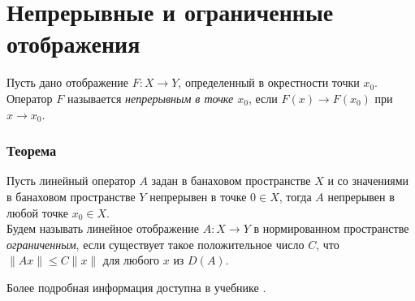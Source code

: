 \section{Непрерывные и ограниченные отображения}
\label{sec:q-9}
Пусть дано отображение $F : X \rightarrow Y$, определенный в окрестности точки $x_0$. Оператор $F$ называется \textit{непрерывным в точке $x_0$}, если $F(x)\rightarrow F(x_0)$ при $x \rightarrow x_0$.

\subsubsection*{Теорема}
Пусть линейный оператор $A$ задан в банаховом пространстве $X$ и со значениями в банаховом пространстве $Y$ непрерывен в точке $0 \in X$, тогда $A$ непрерывен в любой точке $x_0 \in X$\cite[c.~112]{trenogin}.\\

Будем называть линейное отображение $A:X\to Y$ в нормированном пространстве \textit{ограниченным}, если существует такое положительное число $C$, что $\|Ax\| \leqslant C\|x\|$ для любого $x$ из $D(A)$.

Более подробная информация доступна в учебнике \cite[c.~112]{trenogin}.